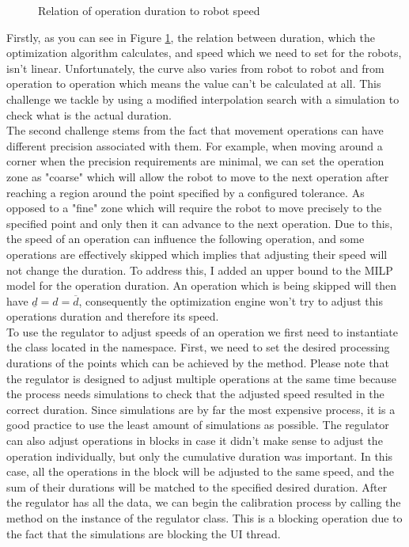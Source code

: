 \begin{figure}[ht]
	\caption{Relation of operation duration to robot speed}
	\centering
	
	\label{fig:SpeedVsDuration}
\end{figure}

Firstly, as you can see in Figure \ref{fig:SpeedVsDuration}, the relation between duration, which the optimization algorithm calculates, and speed which we need to set for the robots, isn't linear. Unfortunately, the curve also varies from robot to robot and from operation to operation which means the value can't be calculated at all. This challenge we tackle by using a modified interpolation search with a simulation to check what is the actual duration. \\

The second challenge stems from the fact that movement operations can have different precision associated with them. For example, when moving around a corner when the precision requirements are minimal, we can set the operation zone as "coarse" which will allow the robot to move to the next operation after reaching a region around the point specified by a configured tolerance. As opposed to a "fine" zone which will require the robot to move precisely to the specified point and only then it can advance to the next operation. Due to this, the speed of an operation can influence the following operation, and some operations are effectively skipped which implies that adjusting their speed will not change the duration. To address this, I added an upper bound to the MILP model for the operation duration. An operation which is being skipped will then have $\underline{d} = d = \overline{d}$, consequently the optimization engine won't try to adjust this operations duration and therefore its speed. \\

To use the regulator to adjust speeds of an operation we first need to instantiate the  class located in the  namespace. First, we need to set the desired processing durations of the points which can be achieved by the  method. Please note that the regulator is designed to adjust multiple operations at the same time because the process needs simulations to check that the adjusted speed resulted in the correct duration. Since simulations are by far the most expensive process, it is a good practice to use the least amount of simulations as possible. The regulator can also adjust operations in blocks in case it didn't make sense to adjust the operation individually, but only the cumulative duration was important. In this case, all the operations in the block will be adjusted to the same speed, and the sum of their durations will be matched to the specified desired duration. After the regulator has all the data, we can begin the calibration process by calling the  method on the instance of the regulator class. This is a blocking operation due to the fact that the simulations are blocking the UI thread. \\

